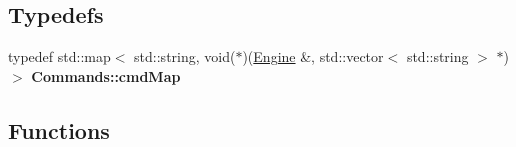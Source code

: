 \subsection*{Typedefs}
\begin{DoxyCompactItemize}
\item 
typedef std\+::map$<$ std\+::string, void($\ast$)(\hyperlink{classEngine}{Engine} \&, std\+::vector$<$ std\+::string $>$ $\ast$)$>$ {\bfseries Commands\+::cmd\+Map}\hypertarget{Commands_8hh_a7d4b7cb98d97ada6d52d98d496d4645b}{}\label{Commands_8hh_a7d4b7cb98d97ada6d52d98d496d4645b}

\end{DoxyCompactItemize}
\subsection*{Functions}
